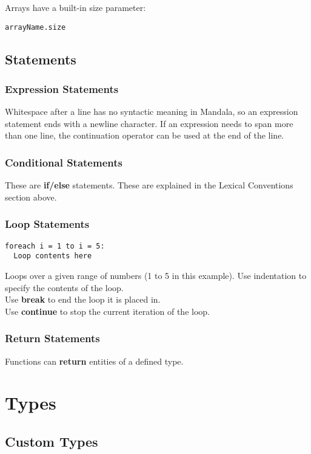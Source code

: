 \documentclass[12pt]{report}
\begin{document}
\noindent Arrays have a built-in size parameter:
\begin{verbatim}
arrayName.size
\end{verbatim}
	
    \subsection*{Statements}
    
    \subsubsection*{Expression Statements}
    Whitespace after a line has no syntactic meaning in Mandala, so an expression statement ends with a newline character. If an expression needs to span more than one line, the continuation operator can be used at the end of the line.
    
    \subsubsection*{Conditional Statements}
    These are \textbf{if/else} statements. These are explained in the Lexical Conventions section above. 
    
    \subsubsection*{Loop Statements}
\begin{verbatim}
foreach i = 1 to i = 5:
  Loop contents here
\end{verbatim}
Loops over a given range of numbers (1 to 5 in this example). 
Use indentation to specify the contents of the loop. \\ 
Use \textbf{break} to end the loop it is placed in. \\ 
Use \textbf{continue} to stop the current iteration of the loop.

	\subsubsection*{Return Statements}
     Functions can \textbf{return} entities of a defined type.

\newpage
{}
\section*{Types}

	\subsection*{Custom Types}
    
\end{document}
